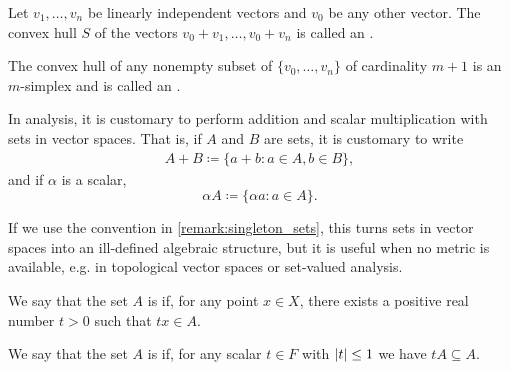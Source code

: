 \begin{definition}\label{def:simplex}
  Let \( v_1, \ldots, v_n \) be linearly independent vectors and \( v_0 \) be any other vector. The convex hull \( S \) of the vectors \( v_0 + v_1, \ldots, v_0 + v_n \) is called an .

  The convex hull of any nonempty subset of \( \{ v_0, \ldots, v_n \} \) of cardinality \( m + 1 \) is an \( m \)-simplex and is called an .
\end{definition}

\begin{remark}\label{remark:vector_space_set_operations}
  In analysis, it is customary to perform addition and scalar multiplication with sets in vector spaces. That is, if \( A \) and \( B \) are sets, it is customary to write
  \begin{align*}
    A + B \coloneqq \{ a + b \colon a \in A, b \in B \},
  \end{align*}
  and if \( \alpha \) is a scalar,
  \begin{equation*}
    \alpha A \coloneqq \{ \alpha a \colon a \in A \}.
  \end{equation*}

  If we use the convention in \cref{remark:singleton_sets}, this turns sets in vector spaces into an ill-defined algebraic structure, but it is useful when no metric is available, e.g. in topological vector spaces or set-valued analysis.
\end{remark}

\begin{definition}\label{def:absorbing_set}\cite[25]{Rudin1991}
  We say that the set \( A \) is  if, for any point \( x \in X \), there exists a positive real number \( t > 0 \) such that \( tx \in A \).
\end{definition}

\begin{definition}\label{def:balanced_set}\cite[6]{Rudin1991}
  We say that the set \( A \) is  if, for any scalar \( t \in F \) with \( \left\vert t \right\vert \leq 1 \) we have \( tA \subseteq A \).
\end{definition}


